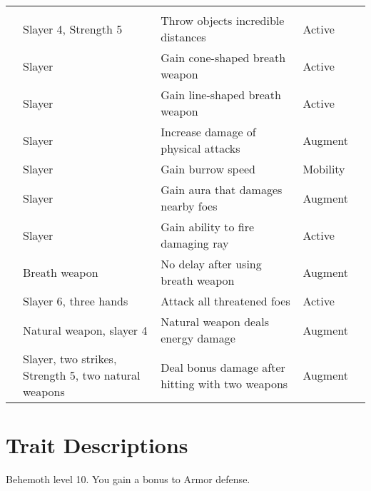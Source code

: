 \begin{longtabuwrapper}
\begin{longtabu}{>{\lcol}p{10em} >{\lcol}p{15em} >{\lcol}X >{\lcol}p{8em} >{\lcol}p{3em}}
            \midrule
            \label{Slayer Traits} &  &  &  &  \\
             & Slayer 4, Strength 5 & Throw objects incredible distances & Active &  \\
             & Slayer & Gain cone-shaped breath weapon & Active &  \\
             & Slayer & Gain line-shaped breath weapon & Active &  \\
             & Slayer & Increase damage of physical attacks & Augment &  \\
             & Slayer & Gain burrow speed & Mobility &  \\
             & Slayer & Gain aura that damages nearby foes & Augment &  \\
             & Slayer & Gain ability to fire damaging ray & Active &  \\
             & Breath weapon & No delay after using breath weapon & Augment &  \\
             & Slayer 6, three hands & Attack all threatened foes & Active &  \\
             & Natural weapon, slayer 4 & Natural weapon deals energy damage & Augment &  \\
             & Slayer, two strikes, Strength 5, two natural weapons & Deal bonus damage after hitting with two weapons & Augment &  \\
        \end{longtabu}
    \end{longtabuwrapper}

    \twocolumn

\section{Trait Descriptions}

    \featpre Behemoth level 10.
    \featben You gain a  bonus to Armor defense.


